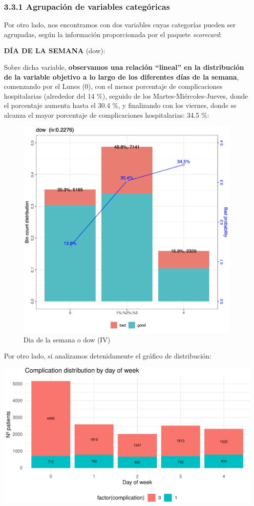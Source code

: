 \documentclass[
]{article}
\begin{document}
\hypertarget{agrupaciuxf3n-de-variables-categuxf3ricas}{%
\subsubsection{3.3.1 Agrupación de variables
categóricas}\label{agrupaciuxf3n-de-variables-categuxf3ricas}}

Por otro lado, nos encontramos con dos variables cuyas categorías pueden
ser agrupadas, según la información proporcionada por el paquete
\emph{scorecard}:

\textbf{DÍA DE LA SEMANA} (dow):

Sobre dicha variable, \textbf{observamos una relación ``lineal'' en la
distribución de la variable objetivo a lo largo de los diferentes días
de la semana}, comenzando por el Lunes (0), con el menor porcentaje de
complicaciones hospitalarias (alrededor del 14 \%), seguido de los
Martes-Miércoles-Jueves, donde el porcentaje aumenta hasta el 30.4 \%, y
finalizando con los viernes, donde se alcanza el mayor porcentaje de
complicaciones hospitalarias: 34.5 \%:

\begin{figure}[h!]

{\centering \includegraphics[width=0.65\linewidth,height=0.65\textheight,]{./capturas/Depuracion/dow} 

}

\caption{Dia de la semana o dow (IV)}\label{fig:unnamed-chunk-12}
\end{figure}

Por otro lado, si analizamos detenidamente el gráfico de distribución:

\includegraphics{memoria_files/figure-latex/unnamed-chunk-13-1}
\end{document}

